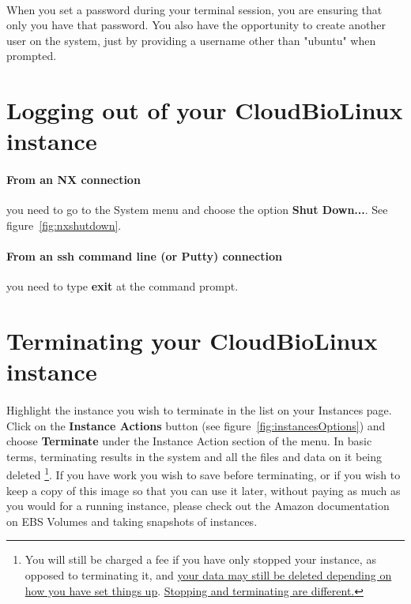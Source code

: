 \paragraph{}When you set a password during your terminal session, you are ensuring that only you have that password. You also have the opportunity to create another user on the system, just by providing a username other than "ubuntu" when prompted.

\section{Logging out of your CloudBioLinux instance}

\paragraph{From an NX connection} you need to go to the System menu and choose the option \textbf{Shut Down...}. See figure~\ref{fig:nxshutdown}.

\paragraph{From an ssh command line (or Putty) connection} you need to type \textbf{exit} at the command prompt.

\section{Terminating your CloudBioLinux instance}

\paragraph{}Highlight the instance you wish to terminate in the list on your Instances page. Click on the \textbf{Instance Actions} button (see figure~\ref{fig:instancesOptions}) and choose \textbf{Terminate} under the Instance Action section of the menu. In basic terms, terminating results in the system and all the files and data on it being deleted \footnote{You will still be charged a fee if you have only stopped your instance, as opposed to terminating it, and 
\href{http://docs.amazonwebservices.com/AWSEC2/latest/UserGuide/index.html?Concepts\_BootFromEBS.html\#Stop\_Start} {your data may still be deleted depending on how you have set things up}. \href{http://support.rightscale.com/06-FAQs/FAQ\_0149\_-_What\%27s\_the\_difference\_between\_Terminating\_and\_Stopping\_an\_EC2\_Instance\%3F}{Stopping and terminating are different.}}. If you have work you wish to save before terminating, or if you wish to keep a copy of this image so that you can use it later, without paying as much as you would for a running instance, please check out the Amazon documentation on EBS Volumes and taking snapshots of instances.


